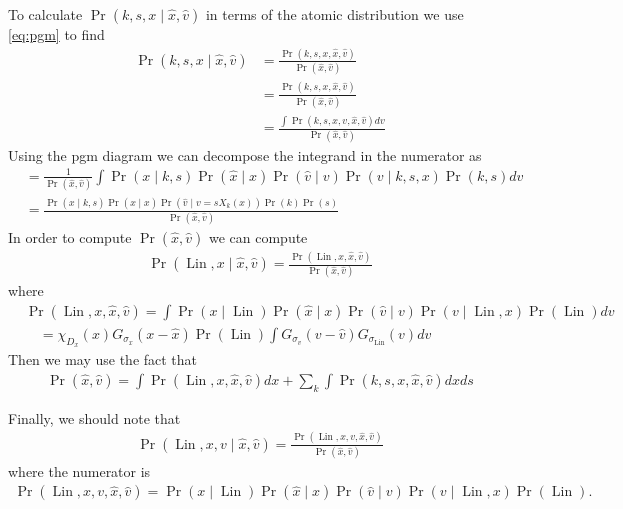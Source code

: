\documentclass[12pt]{amsart}
\DeclareMathOperator{\Lin}{Lin}
\begin{document}
To calculate $\Pr(k,s,x \mid \hat{x}, \hat{v} )$ in terms of the atomic distribution we use \eqref{eq:pgm} to find
\begin{align*}
	\Pr( k,s,x \mid \hat{x}, \hat{v}) &= \frac{ \Pr(k, s, x, \hat{x}, \hat{v} ) }{ \Pr( \hat{x}, \hat{v} ) } \\
		&= \frac{ \Pr(k,s,x, \hat{x}, \hat{v} ) }{ \Pr( \hat{x}, \hat{v}) } \\
		&= \frac{ \int \Pr(k, s, x, v, \hat{x}, \hat{v} ) dv }{ \Pr( \hat{x}, \hat{v} ) }
\end{align*}
Using the pgm diagram we can decompose the integrand in the numerator as
\begin{align*}
	&= \frac{1}{ \Pr( \hat{x}, \hat{v} ) } \int \Pr( x \mid k,s) \Pr( \hat{x} \mid x ) \Pr( \hat{v} \mid v) \Pr( v \mid k,s,x) \Pr(k,s) dv \\
	&= \frac{ \Pr( x \mid k,s) \Pr( \hat{x} \mid x ) \Pr( \hat{v} \mid v = s X_k(x) ) \Pr(k) \Pr(s) }{ \Pr( \hat{x} , \hat{v} ) }
\end{align*}
In order to compute $\Pr( \hat{x}, \hat{v})$ we can compute
\begin{align*}
	\Pr( \Lin , x \mid \hat{x} , \hat{v} ) = \frac{ \Pr( \Lin , x, \hat{x}, \hat{v} ) }{ \Pr( \hat{x}, \hat{v} ) } 
\end{align*}
where
\begin{align*}
	&\Pr( \Lin, x, \hat{x}, \hat{v} ) = \int \Pr( x \mid \Lin ) \Pr( \hat{x} \mid x ) \Pr( \hat{v} \mid v) \Pr( v \mid \Lin ,x) \Pr(\Lin) dv \\
	&\quad =  \chi_{D_x}(x) G_{\sigma_x}( x - \hat{x}) \Pr(\Lin) \int G_{\sigma_v}( v- \hat{v}) G_{\sigma_{\Lin}}( v ) dv
\end{align*}
Then we may use the fact that
\begin{align*}
	\Pr( \hat{x}, \hat{v} ) = \int \Pr( \Lin , x , \hat{x}, \hat{v} )dx  + \sum_{k} \int \Pr( k,s, x , \hat{x} , \hat{v} ) dx ds
\end{align*}

Finally, we should note that
\begin{align*}
	\Pr( \Lin , x, v \mid \hat{x}, \hat{v} ) = \frac{ \Pr( \Lin , x, v ,\hat{x}, \hat{v} ) }{ \Pr( \hat{x} , \hat{v} ) }
\end{align*}
where the numerator is
\begin{align*}
	\Pr( \Lin, x, v, \hat{x}, \hat{v} ) = \Pr( x \mid \Lin ) \Pr( \hat{x} \mid x ) \Pr( \hat{v} \mid v) \Pr( v \mid \Lin ,x) \Pr(\Lin).
\end{align*}
\end{document}
